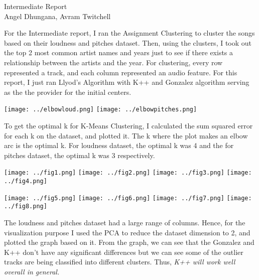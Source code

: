 \documentclass[11pt]{article}
\begin{document}
\begin{center}
    \Large{Intermediate Report }\\
    \large{Angel Dhungana, Avram Twitchell}
    
\end{center}
For the Intermediate report, I ran the Assignment Clustering to cluster the songs based on their loudness and pitches dataset. Then, using the clusters, I took out the top 2 most common artist names and years just to see if there exists a relationship between the artists and the year. For clustering, every row represented a track, and each column represented an audio feature. For this report, I just ran Llyod's Algorithm with K++ and Gonzalez algorithm serving as the the provider for the initial centers. 


\begin{center}
\texttt{[image: ../elbowloud.png]}
\texttt{[image: ../elbowpitches.png]}
\end{center}
To get the optimal k for K-Means Clustering, I calculated the sum squared error for each k on the dataset, and plotted it. The k where the plot makes an elbow arc is the optimal k. For loudness dataset, the optimal k was 4 and the for pitches dataset, the optimal k was 3 respectively.


\begin{center}
\texttt{[image: ../fig1.png]}
\texttt{[image: ../fig2.png]}
\texttt{[image: ../fig3.png]}
\texttt{[image: ../fig4.png]}
\end{center}

\begin{center}
\texttt{[image: ../fig5.png]}
\texttt{[image: ../fig6.png]}
\texttt{[image: ../fig7.png]}
\texttt{[image: ../fig8.png]}
\end{center}

The loudness and pitches dataset had a large range of columns. Hence, for the visualization purpose I used the PCA to reduce the dataset dimension to 2, and plotted the graph based on it. From the graph, we can see that the Gonzalez and K++ don't have any significant differences but we can see some of the outlier tracks are being classified into different clusters. Thus, \textit{K++ will work well overall in general.}
\end{document}
